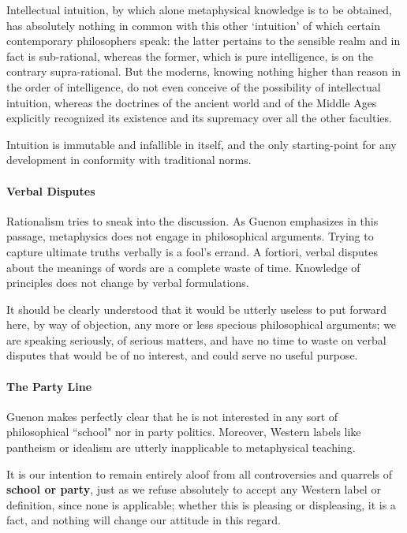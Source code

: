 \begin{quotex}
Intellectual intuition, by which alone metaphysical knowledge is to be obtained, has absolutely nothing in common with this other `intuition' of which certain contemporary philosophers speak: the latter pertains to the sensible realm and in fact is sub-rational, whereas the former, which is pure intelligence, is on the contrary supra-rational. But the moderns, knowing nothing higher than reason in the order of intelligence, do not even conceive of the possibility of intellectual intuition, whereas the doctrines of the ancient world and of the Middle Ages explicitly recognized its existence and its supremacy over all the other faculties.

Intuition is immutable and infallible in itself, and the only starting-point for any development in conformity with traditional norms.

\end{quotex}
\paragraph{Verbal Disputes}
Rationalism tries to sneak into the discussion. As Guenon emphasizes in this passage, metaphysics does not engage in philosophical arguments. Trying to capture ultimate truths verbally is a fool's errand. A fortiori, verbal disputes about the meanings of words are a complete waste of time. Knowledge of principles does not change by verbal formulations.

\begin{quotex}
It should be clearly understood that it would be utterly useless to put forward here, by way of objection, any more or less specious philosophical arguments; we are speaking seriously, of serious matters, and have no time to waste on verbal disputes that would be of no interest, and could serve no useful purpose.

\end{quotex}
\paragraph{The Party Line}
Guenon makes perfectly clear that he is not interested in any sort of philosophical ``school" nor in party politics. Moreover, Western labels like pantheism or idealism are utterly inapplicable to metaphysical teaching.

\begin{quotex}
It is our intention to remain entirely aloof from all controversies and quarrels of \textbf{school or party}, just as we refuse absolutely to accept any Western label or definition, since none is applicable; whether this is pleasing or displeasing, it is a fact, and nothing will change our attitude in this regard.

\end{quotex}
